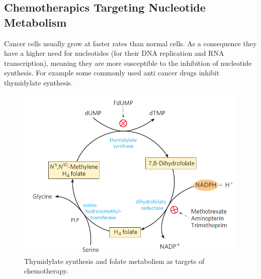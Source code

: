 \documentclass[../main.tex]{subfiles}
\begin{document}
\subsection{\gls{Chemotherapics} Targeting Nucleotide Metabolism}

Cancer cells usually  grow at faster rates than normal cells. As a consequence they have a higher need for nucleotides (for their DNA replication and RNA transcription), meaning they are more susceptible to the inhibition of nucleotide synthesis. For example some commonly used anti cancer drugs inhibit thymidylate synthesis.
\begin{figure}[H]
	\centering
	\includegraphics[width=0.4\linewidth]{cancer_inhib}
	\caption{Thymidylate synthesis and folate metabolism as targets of chemotherapy.}
	\label{fig:cancerinhib}
\end{figure}
\end{document}
